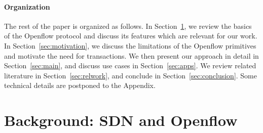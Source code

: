 \documentclass[conference]{sigcomm-alternate}
\newcommand{\liron}[1]{\textit{\textcolor{mygreen}{[liron]: #1}}} %
\newcommand{\petr}[1]{\textit{\textcolor{blue}{[petr]: #1}}} %
\begin{document}

\paragraph{Organization}
The rest of the paper is organized as follows.
In Section~\ref{sec:background}, we review the basics of the  Openflow
protocol and discuss its features which are relevant for our work.
In Section~\ref{sec:motivation}, we discuss the limitations of the Openflow
primitives and motivate the need for transactions.
We then present our approach in detail in Section~\ref{sec:main}, and discuss use cases in Section~\ref{sec:apps}.
We review related literature in Section~\ref{sec:relwork}, and conclude
in Section~\ref{sec:conclusion}. Some technical details are postponed
to the Appendix.


\section{Background: SDN and Openflow}\label{sec:background}
\end{document}
